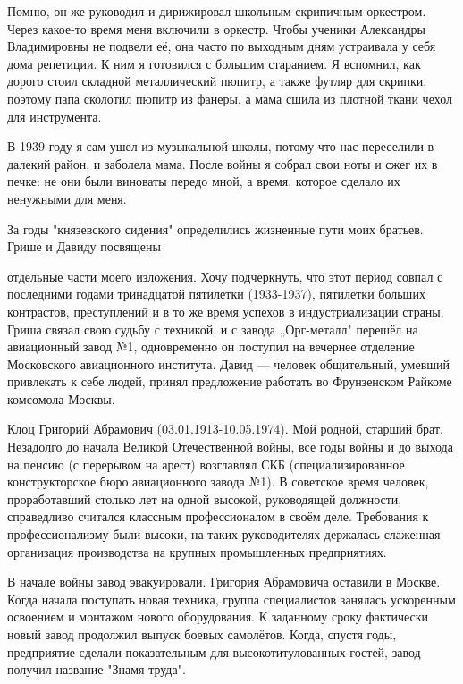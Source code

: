 \label{166-1}
Помню, он же руководил и дирижировал школьным скрипичным оркестром. Через какое-то время меня включили в оркестр. Чтобы ученики Александры Владимировны не подвели её, она часто по выходным дням устраивала у себя дома репетиции. К ним я готовился с большим старанием.
Я вспомнил, как дорого стоил складной металлический пюпитр, а также футляр для скрипки, поэтому папа сколотил пюпитр из фанеры, а мама сшила из плотной ткани чехол для инструмента.

В 1939 году я сам ушел из музыкальной школы, потому что нас переселили в далекий район, и  заболела мама. После войны я собрал свои ноты и сжег их в печке: не они были виноваты передо мной, а время, которое сделало их ненужными для меня.

За годы "князевского сидения" определились жизненные пути моих братьев. Грише и Давиду посвящены 

\label{167-1}
 отдельные части моего изложения. Хочу подчеркнуть, что этот период совпал с последними годами тринадцатой пятилетки (1933-1937), пятилетки больших контрастов, преступлений и в то же время успехов в индустриализации страны. Гриша связал свою судьбу с техникой, и с завода „Орг-металл" перешёл на авиационный завод №1, одновременно он поступил на вечернее отделение Московского авиационного института. Давид — человек общительный, умевший привлекать к себе людей, принял предложение работать во Фрунзенском Райкоме комсомола Москвы.

Клоц Григорий Абрамович (03.01.1913-10.05.1974). Мой родной, старший брат. Незадолго до начала Великой Отечественной войны, все годы войны и до выхода на пенсию (с перерывом на арест) возглавлял СКБ (специализированное конструкторское бюро авиационного завода №1). В советское время человек, проработавший столько лет на одной высокой, руководящей должности, справедливо считался классным профессионалом в своём деле. Требования к профессионализму были высоки, на таких руководителях держалась слаженная организация производства на крупных промышленных предприятиях.

\label{168-1}
В начале войны завод эвакуировали. Григория Абрамовича оставили в Москве. Когда начала поступать новая техника, группа специалистов занялась ускоренным освоением и монтажом нового оборудования. К заданному сроку фактически новый завод продолжил выпуск боевых самолётов. Когда, спустя годы, предприятие сделали показательным для высокотитулованных гостей, завод получил название "Знамя труда".

